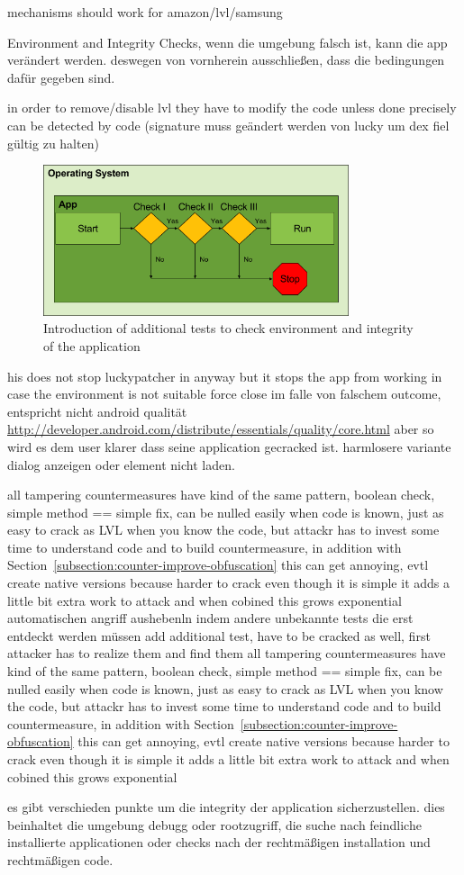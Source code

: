 mechanisms should work for amazon/lvl/samsung


Environment and Integrity Checks, wenn die umgebung falsch ist, kann die app verändert werden. deswegen von vornherein ausschließen, dass die bedingungen dafür gegeben sind.\cite{munteanLicense}

in order to remove/disable lvl they have to modify the code
unless done precisely can be detected by code (signature muss geändert werden von lucky um dex fiel gültig zu halten)\cite{developersSecuring}

\begin{figure}[h]
    \centering
    \includegraphics[width=0.8\textwidth]{data/verificationNowAdditional.png}
    \caption{Introduction of additional tests to check environment and integrity of the application}
    \label{fig:verificationNowAdditional}
\end{figure}
his does not stop luckypatcher in anyway but it stops the app from working in case the environment is not suitable
force close im falle von falschem outcome, entspricht nicht android qualität
\url{http://developer.android.com/distribute/essentials/quality/core.html} aber so wird es dem user klarer dass seine application gecracked ist. harmlosere variante dialog anzeigen oder element nicht laden.

all tampering countermeasures have kind of the same pattern, boolean check, simple method == simple fix, can be nulled easily when code is known, just as easy to crack as LVL when you know the code, but attackr has to invest some time to understand code and to build countermeasure, in addition with Section~\ref{subsection:counter-improve-obfuscation} this can get annoying, evtl create native versions because harder to crack
even though it is simple it adds a little bit extra work to attack and when cobined this grows exponential
automatischen angriff aushebenln indem andere unbekannte tests die erst entdeckt werden müssen
add additional test, have to be cracked as well, first attacker has to realize them and find them
all tampering countermeasures have kind of the same pattern, boolean check, simple method == simple fix, can be nulled easily when code is known, just as easy to crack as LVL when you know the code, but attackr has to invest some time to understand code and to build countermeasure, in addition with Section~\ref{subsection:counter-improve-obfuscation} this can get annoying, evtl create native versions because harder to crack
even though it is simple it adds a little bit extra work to attack and when cobined this grows exponential

es gibt verschieden punkte um die integrity der application sicherzustellen. dies beinhaltet die umgebung debugg oder rootzugriff, die suche nach feindliche installierte applicationen oder checks nach der rechtmäßigen installation und rechtmäßigen code.
